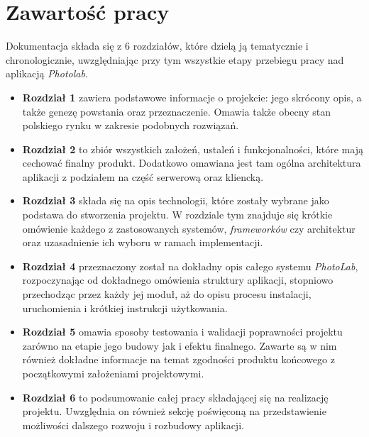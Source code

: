 \section{Zawartość pracy}
\quad Dokumentacja składa się z 6 rozdziałów, które dzielą ją tematycznie i chronologicznie, uwzględniając przy tym wszystkie etapy przebiegu pracy nad aplikacją \textit{Photolab}.

\begin{itemize}
\item \textbf{Rozdział 1} zawiera podstawowe informacje o projekcie: jego skrócony opis, a także genezę powstania oraz przeznaczenie. Omawia także obecny stan polskiego rynku
w zakresie podobnych rozwiązań.
\item \textbf{Rozdział 2} to zbiór wszystkich założeń, ustaleń i funkcjonalności, które mają cechować finalny produkt. Dodatkowo omawiana jest tam ogólna architektura aplikacji z podziałem na część serwerową oraz kliencką.
\item \textbf{Rozdział 3} składa się na opis technologii, które zostały wybrane jako podstawa do stworzenia projektu. W rozdziale tym znajduje się krótkie omówienie każdego z zastosowanych systemów, \textit{frameworków} czy architektur oraz uzasadnienie ich wyboru w ramach implementacji.
\item \textbf{Rozdział 4} przeznaczony został na dokładny opis całego systemu \textit{PhotoLab}, rozpoczynając od dokładnego omówienia struktury aplikacji, stopniowo przechodząc przez każdy jej moduł, aż do opisu procesu instalacji, uruchomienia i krótkiej instrukcji użytkowania.
\item \textbf{Rozdział 5} omawia sposoby testowania i walidacji poprawności projektu zarówno na etapie jego budowy jak i efektu finalnego. Zawarte są w nim również dokładne informacje na temat zgodności produktu końcowego z początkowymi założeniami projektowymi.
\item \textbf{Rozdział 6} to podsumowanie całej pracy składającej się na realizację projektu. Uwzględnia on również sekcję poświęconą na przedstawienie możliwości dalszego rozwoju i rozbudowy aplikacji.
\end{itemize}
